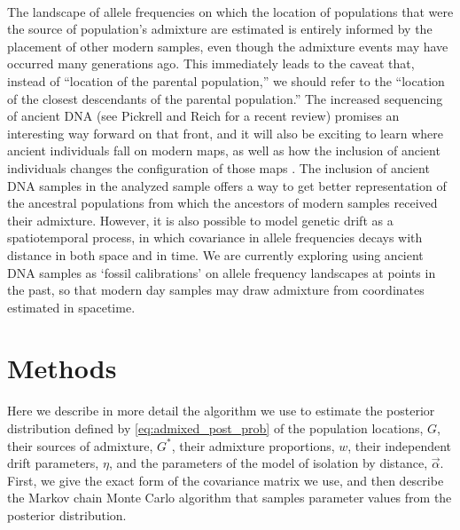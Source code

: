 \documentclass[10pt,letterpaper]{article}
\newcommand{\identifyadmixsource}[1]{{#1^{*}}}
\providecommand{\DIFadd}[1]{{\protect\color{blue}\uwave{#1}}} %
\providecommand{\DIFaddbegin}{} %
\providecommand{\DIFaddend}{} %
\begin{document}
\DIFaddbegin \paragraph{\DIFadd{Future Work}}
\DIFaddend The landscape of allele frequencies on which the location of populations that were the source of population's admixture
are estimated is entirely informed by the placement of other modern samples,
even though the admixture events may have occurred many generations ago.
This immediately leads to the caveat that, instead of ``location of the parental population,''
we should refer to the ``location of the closest descendants of the parental population.''
The increased sequencing of ancient DNA (see Pickrell and Reich \cite{pickrell_reich:14} for a recent review) promises an interesting way forward on that front,
and it will also be exciting to learn where ancient individuals fall on modern maps, 
as well as how the inclusion of ancient individuals changes the configuration of those maps \cite{skoglund_investigating_2014}.
The inclusion of ancient DNA samples in the analyzed sample offers a way to get better representation of the ancestral populations from which the ancestors of modern samples received their admixture.  
However, it is also possible to model genetic drift as a spatiotemporal process, 
in which covariance in allele frequencies decays with distance in both space and in time.  
We are currently exploring using ancient DNA samples as  `fossil calibrations' on allele frequency landscapes at points in the past, 
so that modern day samples may draw admixture from coordinates estimated in spacetime.

\section*{Methods}
Here we describe in more detail the algorithm we use to estimate the posterior distribution defined by \eqref{eq:admixed_post_prob} 
of the population locations, $G$, 
their sources of admixture, $\identifyadmixsource{G}$, 
their admixture proportions, $w$, 
their independent drift parameters, $\eta$, 
and the parameters of the model of isolation by distance, $\vec{\alpha}$.  
First, we give the exact form of the covariance matrix we use,
and then describe the Markov chain Monte Carlo algorithm 
that samples parameter values from the posterior distribution.
\end{document}
